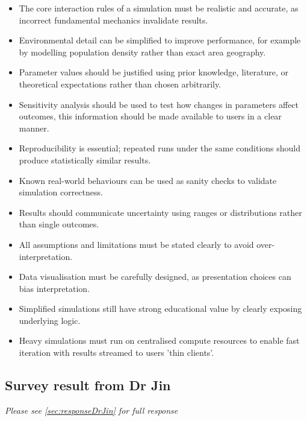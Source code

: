\begin{itemize}
  \item The core interaction rules of a simulation must be realistic and accurate, as incorrect fundamental mechanics invalidate results.
  \item Environmental detail can be simplified to improve performance, for example by modelling population density rather than exact area geography.
  \item Parameter values should be justified using prior knowledge, literature, or theoretical expectations rather than chosen arbitrarily.
  \item Sensitivity analysis should be used to test how changes in parameters affect outcomes, this information should be made available to users in a clear manner.
  \item Reproducibility is essential; repeated runs under the same conditions should produce statistically similar results.
  \item Known real-world behaviours can be used as sanity checks to validate simulation correctness.
  \item Results should communicate uncertainty using ranges or distributions rather than single outcomes.
  \item All assumptions and limitations must be stated clearly to avoid over-interpretation.
  \item Data visualisation must be carefully designed, as presentation choices can bias interpretation.
  \item Simplified simulations still have strong educational value by clearly exposing underlying logic.
  \item Heavy simulations must run on centralised compute resources to enable fast iteration with results streamed to users 'thin clients'.
\end{itemize}

\subsection{Survey result from Dr Jin}

\textit{Please see \autoref{sec:responseDrJin} for full response}

